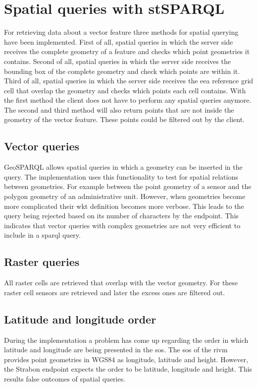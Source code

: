 \section{Spatial queries with stSPARQL}
\label{par:spQueries}
For retrieving data about a vector feature three methods for spatial querying have been implemented. First of all, spatial queries in which the server side receives the complete geometry of a feature and checks which point geometries it contains. Second of all, spatial queries in which the server side receives the bounding box of the complete geometry and check which points are within it. Third of all, spatial queries in which the server side receives the \ac{eea} reference grid cell that overlap the geometry and checks which points each cell contains. With the first method the client does not have to perform any spatial queries anymore. The second and third method will also return points that are not inside the geometry of the vector feature. These points could be filtered out by the client. 

\subsection{Vector queries}
GeoSPARQL allows spatial queries in which a geometry can be inserted in the query. The implementation uses this functionality to test for spatial relations between geometries. For example between the point geometry of a sensor and the polygon geometry of an administrative unit. However, when geometries become more complicated their \ac{wkt} definition becomes more verbose. This leads to the query being rejected based on its number of characters by the endpoint. This indicates that vector queries with complex geometries are not very efficient to include in a \ac{sparql} query.     

\subsection{Raster queries}
All raster cells are retrieved that overlap with the vector geometry. For these raster cell sensors are retrieved and later the excess ones are filtered out. 

\subsection{Latitude and longitude order}
During the implementation a problem has come up regarding the order in which latitude and longitude are being presented in the \ac{sos}. The \ac{sos} of the \ac{rivm} provides point geometries in WGS84 as longitude, latitude and height. However, the Strabon endpoint expects the order to be latitude, longitude and height. This results false outcomes of spatial queries.    